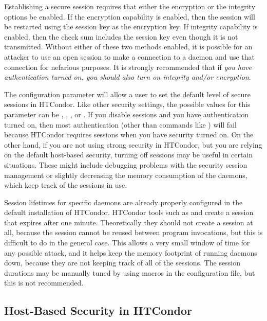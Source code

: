 Establishing a secure session requires that either the encryption or the integrity options be enabled.
If the encryption capability is enabled, then the session will be restarted using the session key
as the encryption key.
If integrity capability is enabled, then the check sum includes the session key even
though it is not transmitted.
Without either of these two methods enabled,
it is possible for an
attacker to use an open session to make a connection to a daemon and
use that connection for nefarious purposes.
It is strongly recommended that if \emph{you have authentication turned
on, you should also turn on integrity and/or encryption}.

The configuration parameter  will allow
a user to set the default level of secure sessions in HTCondor.
Like other security settings, the possible values for this parameter can be
\verb@REQUIRED@, \verb@PREFERRED@, \verb@OPTIONAL@,
or \verb@NEVER@.
If you disable sessions and you have authentication turned
on, then most authentication (other than commands like
) will fail because HTCondor requires sessions when you
have security turned on. 
On the other hand, if you are not using strong security in HTCondor, but
you are relying on the default host-based security, turning off
sessions may be useful in certain situations. These might include debugging problems
with the security session management or slightly decreasing the memory
consumption of the daemons, which keep track of the sessions in use. 

Session lifetimes for specific daemons are already properly configured in the default installation
of HTCondor.
HTCondor tools such as  and  create a
session that expires after one minute. 
Theoretically they should not create a session at all,
because the
session cannot be reused between program invocations, but this is
difficult to do in the general case.
This allows a very small window of time for any possible attack,
and it helps
keep the memory footprint of running daemons down,
because they are not keeping track of all of the sessions.
The session durations may be manually tuned
by using macros in the configuration file,
but this is not recommended.


\subsection{\label{sec:Host-Security}Host-Based Security in
HTCondor} 

